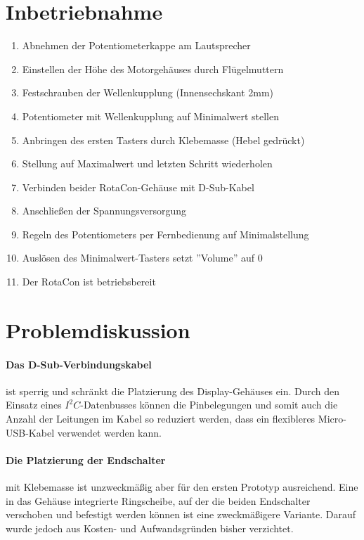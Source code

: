 \documentclass[11pt, titlepage]{report}
\begin{document}
		\section{Inbetriebnahme}
			\label{sec:HowTo}
			\begin{enumerate}
				\item Abnehmen der Potentiometerkappe am Lautsprecher
				\item Einstellen der Höhe des Motorgehäuses durch Flügelmuttern
				\item Festschrauben der Wellenkupplung (Innensechskant 2mm)
				\item Potentiometer mit Wellenkupplung auf Minimalwert stellen
				\item Anbringen des ersten Tasters durch Klebemasse (Hebel gedrückt)
				\item Stellung auf Maximalwert und letzten Schritt wiederholen
				\item Verbinden beider RotaCon-Gehäuse mit D-Sub-Kabel
				\item Anschließen der Spannungsversorgung
				\item Regeln des Potentiometers per Fernbedienung auf Minimalstellung
				\item Auslösen des Minimalwert-Tasters setzt ''Volume'' auf 0
				\item Der RotaCon ist betriebsbereit
			\end{enumerate}
		\newpage
		\section{Problemdiskussion}
		\label{sec:Probleme}
			\paragraph{Das D-Sub-Verbindungskabel}
			ist sperrig und schränkt die Platzierung des Display-Gehäuses ein. Durch den Einsatz eines $I^{2}C$-Datenbusses können die Pinbelegungen und somit auch die Anzahl der Leitungen im Kabel so reduziert werden, dass ein flexibleres Micro-USB-Kabel verwendet werden kann.
			
			\paragraph{Die Platzierung der Endschalter}
			mit Klebemasse ist unzweckmäßig aber für den ersten Prototyp ausreichend. Eine in das Gehäuse integrierte Ringscheibe, auf der die beiden Endschalter verschoben und befestigt werden können ist eine zweckmäßigere Variante. Darauf wurde jedoch aus Kosten- und Aufwandsgründen bisher verzichtet.
			
\end{document}

